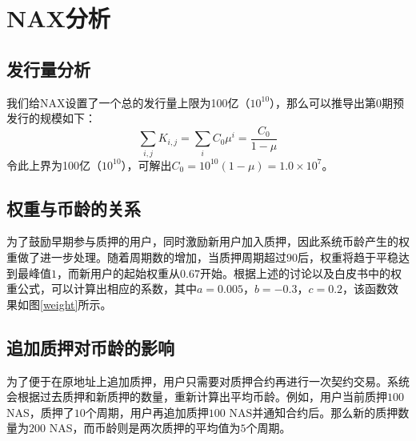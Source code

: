 \section{NAX分析}
\subsection{发行量分析}
我们给NAX设置了一个总的发行量上限为100亿（\(10^{10}\)），那么可以推导出第0期预发行的规模如下：
\begin{equation}
  \sum_{i,j} K_{i,j} = \sum_i C_0 \mu^i = \frac{C_0}{1-\mu}
\end{equation}
  令此上界为100亿（\(10^{10}\)），可解出\(C_0 = 10^{10}(1-\mu) = 1.0\times10^7\)。

\subsection{权重与币龄的关系}
为了鼓励早期参与质押的用户，同时激励新用户加入质押，因此系统币龄产生的权重做了进一步处理。随着周期数的增加，当质押周期超过$90$后，权重将趋于平稳达到最峰值$1$，而新用户的起始权重从$0.67$开始。根据上述的讨论以及白皮书中的权重公式，可以计算出相应的系数，其中\(a=0.005\)，\(b=-0.3\)，\(c=0.2\)，该函数效果如图\ref{weight}所示。

\subsection{追加质押对币龄的影响}
为了便于在原地址上追加质押，用户只需要对质押合约再进行一次契约交易。系统会根据过去质押和新质押的数量，重新计算出平均币龄。例如，用户当前质押$100$NAS，质押了$10$个周期，用户再追加质押$100$ NAS并通知合约后。那么新的质押数量为$200$ NAS，而币龄则是两次质押的平均值为$5$个周期。
